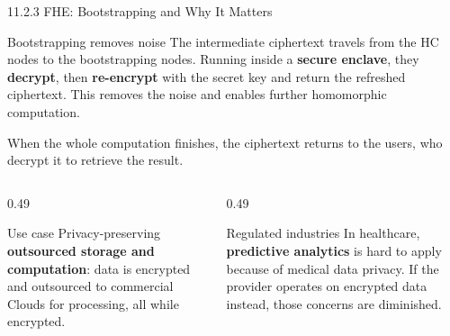 \documentclass[11pt,aspectratio=169]{beamer}
\newcommand{\kw}[1]{\textbf{\color{accent}#1}}
\begin{document}
\begin{frame}{11.2.3 FHE: Bootstrapping and Why It Matters}
  \begin{block}{Bootstrapping removes noise}
    \small
    The intermediate ciphertext travels from the HC nodes to the bootstrapping
    nodes. Running inside a \kw{secure enclave}, they \kw{decrypt}, then
    \kw{re-encrypt} with the secret key and return the refreshed ciphertext.
    This removes the noise and enables further homomorphic computation.
  \end{block}
  \vspace{0.6em}

  \small
  When the whole computation finishes, the ciphertext returns to the users,
  who decrypt it to retrieve the result.
  \vspace{0.9em}

  \begin{columns}[T,onlytextwidth]
    \begin{column}{0.49\textwidth}
      \begin{block}{Use case}
        \scriptsize
        Privacy-preserving \kw{outsourced storage and computation}: data is
        encrypted and outsourced to commercial Clouds for processing, all
        while encrypted.
      \end{block}
    \end{column}
    \begin{column}{0.49\textwidth}
      \begin{block}{Regulated industries}
        \scriptsize
        In healthcare, \kw{predictive analytics} is hard to apply because of
        medical data privacy. If the provider operates on encrypted data
        instead, those concerns are diminished.
      \end{block}
    \end{column}
  \end{columns}
\end{frame}
\end{document}
